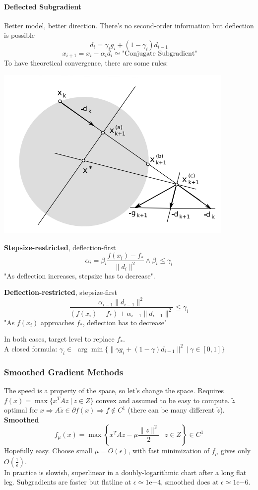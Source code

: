 \documentclass[10pt]{report}
\begin{document}
\paragraph{Deflected Subgradient} Better model, better direction. There's no second-order information but deflection is possible $$d_i = \gamma_ig_i+(1-\gamma_i)d_{i-1}$$ $$\:x_{i+1}=x_i-\alpha_id_i\simeq \text{"Conjugate Subgradient"}$$
To have theoretical convergence, there are some rules:
\begin{multicols}{2}
\begin{center}
	\includegraphics[scale=0.66]{8.png}
\end{center}
\columnbreak
\begin{list}{}{}
	\item \textbf{Stepsize-restricted}, deflection-first\\
	$$\alpha_i = \beta_i\frac{f(x_i)-f_*}{\|d_i\|^2}\wedge\beta_i\leq\gamma_i$$
	"As deflection increases, stepsize has to decrease".
	\item \textbf{Deflection-restricted}, stepsize-first\\
	$$\frac{\alpha_{i-1}\|d_{i-1}\|^2}{(f(x_i)-f_*)+\alpha_{i-1}\|d_{i-1}\|^2}\leq \gamma_i$$
	"As $f(x_i)$ approaches $f_*$, deflection has to decrease"
\end{list}
\end{multicols}
In both cases, target level to replace $f_*$.\\
A closed formula: $\gamma_i\in$ $\arg\min\{\|\gamma g_i+(1-\gamma)d_{i-1}\|^2\:|\:\gamma\in[0,1]\}$
\subsubsection{Smoothed Gradient Methods} The speed is a property of the space, so let's change the space. Requires $f(x) = \max\{x^TAz\:|\:z\in Z\}$ convex and assumed to be easy to compute. $\tilde{z}$ optimal for $x\Rightarrow A\tilde{z}\in\partial f(x)\Rightarrow f\not\in C^1$ (there can be many different $\tilde{z}$).\\
\textbf{Smoothed} $$f_\mu(x)=\max\left\{x^TAz-\mu\frac{\|z\|^2}{2}\:|\:z\in Z\right\}\in C^1$$ Hopefully easy. Choose small $\mu=O(\epsilon)$, with fast minimization of $f_\mu$ gives only $O(\frac{1}{\epsilon})$.\\
In practice is slowish, superlinear in a doubly-logarithmic chart after a long flat leg. Subgradients are faster but flatline at $\epsilon\simeq 1$e$-4$, smoothed does at $\epsilon\simeq 1$e$-6$.
\end{document}
